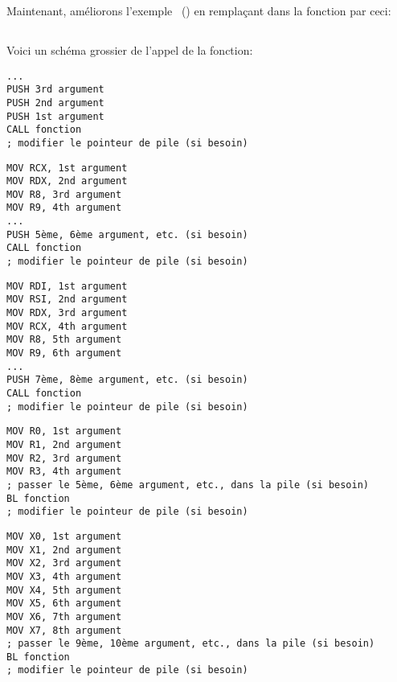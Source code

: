 ﻿\mysection{\PrintfSeveralArgumentsSectionName}

Maintenant, améliorons l'exemple \IT{\HelloWorldSectionName}~()
en remplaçant \printf dans la fonction \main par ceci:







\subsection{\Conclusion{}}

Voici un schéma grossier de l'appel de la fonction:

\begin{lstlisting}[caption=x86,style=customasmx86]
...
PUSH 3rd argument
PUSH 2nd argument
PUSH 1st argument
CALL fonction
; modifier le pointeur de pile (si besoin)
\end{lstlisting}

\begin{lstlisting}[caption=x64 (MSVC),style=customasmx86]
MOV RCX, 1st argument
MOV RDX, 2nd argument
MOV R8, 3rd argument
MOV R9, 4th argument
...
PUSH 5ème, 6ème argument, etc. (si besoin)
CALL fonction
; modifier le pointeur de pile (si besoin)
\end{lstlisting}

\begin{lstlisting}[caption=x64 (GCC),style=customasmx86]
MOV RDI, 1st argument
MOV RSI, 2nd argument
MOV RDX, 3rd argument
MOV RCX, 4th argument
MOV R8, 5th argument
MOV R9, 6th argument
...
PUSH 7ème, 8ème argument, etc. (si besoin)
CALL fonction
; modifier le pointeur de pile (si besoin)
\end{lstlisting}

\begin{lstlisting}[caption=ARM,style=customasmARM]
MOV R0, 1st argument
MOV R1, 2nd argument
MOV R2, 3rd argument
MOV R3, 4th argument
; passer le 5ème, 6ème argument, etc., dans la pile (si besoin)
BL fonction
; modifier le pointeur de pile (si besoin)
\end{lstlisting}

\begin{lstlisting}[caption=ARM64,style=customasmARM]
MOV X0, 1st argument
MOV X1, 2nd argument
MOV X2, 3rd argument
MOV X3, 4th argument
MOV X4, 5th argument
MOV X5, 6th argument
MOV X6, 7th argument
MOV X7, 8th argument
; passer le 9ème, 10ème argument, etc., dans la pile (si besoin)
BL fonction
; modifier le pointeur de pile (si besoin)
\end{lstlisting}

